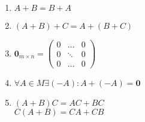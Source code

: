 \begin{properties}\leavevmode
    \def\zero{\textbf{0}}
    \begin{enumerate}
        \item
            $A + B = B + A$
        \item
            $(A + B) + C = A + (B+C)$
        \item
            $\zero_{m\times n} =
            \begin{pmatrix}
                0 & \dots & 0\\
                0 & \ddots & 0\\
                0 & \dots & 0
            \end{pmatrix}$
        \item
            $\forall A \in M \exists (-A): A + (-A) = \zero$
        \item
            $(A+B)C = AC + BC$\\
            $C(A+B) = CA + CB$
    \end{enumerate}
\end{properties}

